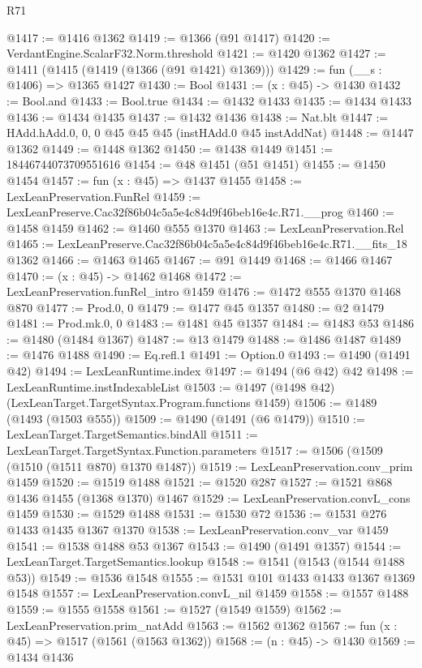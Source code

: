 \begin{lexlean}{R71}
\begin{coremodule}
@1417 := @1416 @1362
@1419 := @1366 (@91 @1417)
@1420 := VerdantEngine.ScalarF32.Norm.threshold
@1421 := @1420 @1362
@1427 := @1411 (@1415 (@1419 (@1366 (@91 @1421) @1369)))
@1429 := fun (__s : @1406) => @1365 @1427
@1430 := Bool
@1431 := (x : @45) -> @1430
@1432 := Bool.and
@1433 := Bool.true
@1434 := @1432 @1433
@1435 := @1434 @1433
@1436 := @1434 @1435
@1437 := @1432 @1436
@1438 := Nat.blt
@1447 := HAdd.hAdd.{0, 0, 0} @45 @45 @45 (instHAdd.{0} @45 instAddNat)
@1448 := @1447 @1362
@1449 := @1448 @1362
@1450 := @1438 @1449
@1451 := 18446744073709551616
@1454 := @48 @1451 (@51 @1451)
@1455 := @1450 @1454
@1457 := fun (x : @45) => @1437 @1455
@1458 := LexLeanPreservation.FunRel
@1459 := LexLeanPreserve.Cac32f86b04c5a5e4c84d9f46beb16e4c.R71.__prog
@1460 := @1458 @1459
@1462 := @1460 @555 @1370
@1463 := LexLeanPreservation.Rel
@1465 := LexLeanPreserve.Cac32f86b04c5a5e4c84d9f46beb16e4c.R71.__fits_18 @1362
@1466 := @1463 @1465
@1467 := @91 @1449
@1468 := @1466 @1467
@1470 := (x : @45) -> @1462 @1468
@1472 := LexLeanPreservation.funRel_intro @1459
@1476 := @1472 @555 @1370 @1468 @870
@1477 := Prod.{0, 0}
@1479 := @1477 @45 @1357
@1480 := @2 @1479
@1481 := Prod.mk.{0, 0}
@1483 := @1481 @45 @1357
@1484 := @1483 @53
@1486 := @1480 (@1484 @1367)
@1487 := @13 @1479
@1488 := @1486 @1487
@1489 := @1476 @1488
@1490 := Eq.refl.{1}
@1491 := Option.{0}
@1493 := @1490 (@1491 @42)
@1494 := LexLeanRuntime.index
@1497 := @1494 (@6 @42) @42
@1498 := LexLeanRuntime.instIndexableList
@1503 := @1497 (@1498 @42) (LexLeanTarget.TargetSyntax.Program.functions @1459)
@1506 := @1489 (@1493 (@1503 @555))
@1509 := @1490 (@1491 (@6 @1479))
@1510 := LexLeanTarget.TargetSemantics.bindAll
@1511 := LexLeanTarget.TargetSyntax.Function.parameters
@1517 := @1506 (@1509 (@1510 (@1511 @870) @1370 @1487))
@1519 := LexLeanPreservation.conv_prim @1459
@1520 := @1519 @1488
@1521 := @1520 @287
@1527 := @1521 @868 @1436 @1455 (@1368 @1370) @1467
@1529 := LexLeanPreservation.convL_cons @1459
@1530 := @1529 @1488
@1531 := @1530 @72
@1536 := @1531 @276 @1433 @1435 @1367 @1370
@1538 := LexLeanPreservation.conv_var @1459
@1541 := @1538 @1488 @53 @1367
@1543 := @1490 (@1491 @1357)
@1544 := LexLeanTarget.TargetSemantics.lookup
@1548 := @1541 (@1543 (@1544 @1488 @53))
@1549 := @1536 @1548
@1555 := @1531 @101 @1433 @1433 @1367 @1369 @1548
@1557 := LexLeanPreservation.convL_nil @1459
@1558 := @1557 @1488
@1559 := @1555 @1558
@1561 := @1527 (@1549 @1559)
@1562 := LexLeanPreservation.prim_natAdd
@1563 := @1562 @1362
@1567 := fun (x : @45) => @1517 (@1561 (@1563 @1362))
@1568 := (n : @45) -> @1430
@1569 := @1434 @1436

\end{coremodule}
\end{lexlean}
